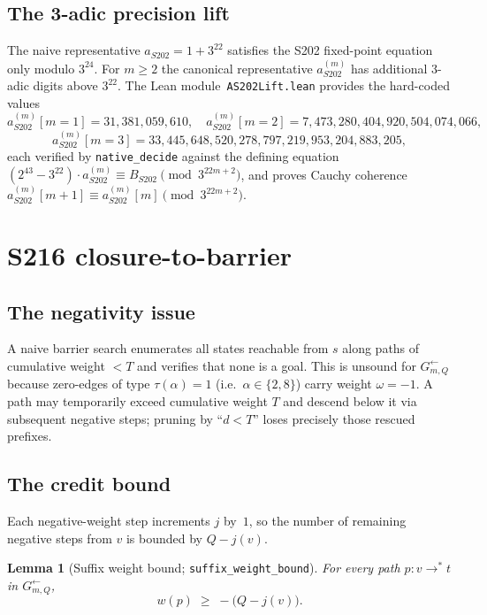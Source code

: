 \documentclass[11pt,a4paper]{article}
\theoremstyle{plain}
\newtheorem{lemma}[theorem]{Lemma}
\theoremstyle{definition}
\newcommand{\aS}{a_{S202}}
\newcommand{\aSat}{a_{S202}^{(m)}}
\newcommand{\InvG}{G^{\!\leftarrow}}
\begin{document}
\subsection{The 3-adic precision lift}\label{sec:lift}

The naive representative $\aS = 1 + 3^{22}$ satisfies the S202
fixed-point equation only modulo $3^{24}$. For $m \ge 2$ the
canonical representative $\aSat$ has additional 3-adic digits above
$3^{22}$. The Lean module~\texttt{AS202Lift.lean} provides the
hard-coded values
\[
  \aSat[m=1] = 31{,}381{,}059{,}610, \quad
  \aSat[m=2] = 7{,}473{,}280{,}404{,}920{,}504{,}074{,}066,
\]
\[
  \aSat[m=3] = 33{,}445{,}648{,}520{,}278{,}797{,}219{,}953{,}204{,}883{,}205,
\]
each verified by \texttt{native\_decide} against the defining
equation $(2^{43} - 3^{22}) \cdot \aSat \equiv B_{S202}
\pmod{3^{22m+2}}$, and proves Cauchy coherence
$\aSat[m{+}1] \equiv \aSat[m] \pmod{3^{22m+2}}$.

\section{S216 closure-to-barrier}\label{sec:bf-closure}

\subsection{The negativity issue}

A naive barrier search enumerates all states reachable from $s$ along
paths of cumulative weight $< T$ and verifies that none is a goal.
This is unsound for $\InvG_{m,Q}$ because zero-edges of type
$\tau(\alpha) = 1$ (i.e.\ $\alpha \in \{2, 8\}$) carry weight
$\omega = -1$. A path may temporarily exceed cumulative weight $T$
and descend below it via subsequent negative steps; pruning by
``$d < T$'' loses precisely those rescued prefixes.

\subsection{The credit bound}

Each negative-weight step increments $j$ by~$1$, so the number of
remaining negative steps from $v$ is bounded by $Q - j(v)$.

\begin{lemma}[Suffix weight bound; \texttt{suffix\_weight\_bound}]\label{lem:suffix}
For every path $p : v \to^{*} t$ in $\InvG_{m, Q}$,
\[
  w(p) \;\ge\; -\bigl(Q - j(v)\bigr).
\]
\end{lemma}
\end{document}
